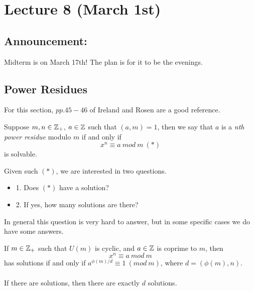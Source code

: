 \section{Lecture 8 (March 1st)}

\subsection{Announcement:}
Midterm is on March 17th! The plan is for it to be the evenings.

\subsection{Power Residues}
For this section, $pp.45 - 46$ of Ireland and Rosen are a good reference.

\begin{definition}
Suppose $m, n \in \mathbb{Z}_+$, $a \in \mathbb{Z}$ such that $(a, m) = 1$, then we say that $a$ is a \textit{nth power residue} modulo $m$ if and only if
\[x^n \equiv a\ mod\ m\ (*)\]
is solvable.
\end{definition}

\noindent Given such $(*)$, we are interested in two questions.
\begin{itemize}
    \item 1. Does $(*)$ have a solution?
    \item 2. If yes, how many solutions are there?
\end{itemize}
In general this question is very hard to answer, but in some specific cases we do have some answers.

\begin{proposition}[4.2.1]
If $m \in \mathbb{Z}_+$ such that $U(m)$ is cyclic, and $a \in \mathbb{Z}$ is coprime to $m$, then
\[x^n \equiv a\ mod\ m\]
has solutions if and only if $a^{\phi(m)/d} \equiv 1\ (mod\ m)$, where $d = (\phi(m), n)$.\\\\
If there are solutions, then there are exactly $d$ solutions.
\end{proposition}

